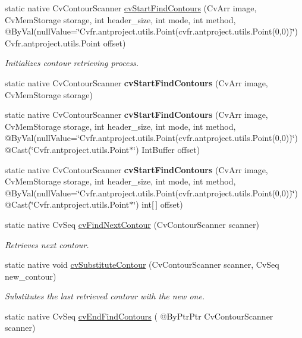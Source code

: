 \begin{DoxyCompactItemize}
\item 
static native Cv\+Contour\+Scanner \hyperlink{group__imgproc__c_ga17ceae2468b1b23ece917fb982a377ff}{cv\+Start\+Find\+Contours} (Cv\+Arr image, Cv\+Mem\+Storage storage, int header\+\_\+size, int mode, int method, @By\+Val(null\+Value=\char`\"{}Cv\+fr.antproject.utils.Point(cv\+fr.antproject.utils.Point(0,0))\char`\"{}) Cv\+fr.antproject.utils.Point offset)
\begin{DoxyCompactList}\small\item\em Initializes contour retrieving process. \end{DoxyCompactList}\item 
static native Cv\+Contour\+Scanner {\bfseries cv\+Start\+Find\+Contours} (Cv\+Arr image, Cv\+Mem\+Storage storage)
\item 
static native Cv\+Contour\+Scanner {\bfseries cv\+Start\+Find\+Contours} (Cv\+Arr image, Cv\+Mem\+Storage storage, int header\+\_\+size, int mode, int method, @By\+Val(null\+Value=\char`\"{}Cv\+fr.antproject.utils.Point(cv\+fr.antproject.utils.Point(0,0))\char`\"{}) @Cast(\char`\"{}Cv\+fr.antproject.utils.Point$\ast$\char`\"{}) Int\+Buffer offset)
\item 
static native Cv\+Contour\+Scanner {\bfseries cv\+Start\+Find\+Contours} (Cv\+Arr image, Cv\+Mem\+Storage storage, int header\+\_\+size, int mode, int method, @By\+Val(null\+Value=\char`\"{}Cv\+fr.antproject.utils.Point(cv\+fr.antproject.utils.Point(0,0))\char`\"{}) @Cast(\char`\"{}Cv\+fr.antproject.utils.Point$\ast$\char`\"{}) int\mbox{[}$\,$\mbox{]} offset)
\item 
static native Cv\+Seq \hyperlink{group__imgproc__c_gab3ea632f49f741ef73888cd1ab8f9556}{cv\+Find\+Next\+Contour} (Cv\+Contour\+Scanner scanner)
\begin{DoxyCompactList}\small\item\em Retrieves next contour. \end{DoxyCompactList}\item 
static native void \hyperlink{group__imgproc__c_ga9d72a578b9f29589e8b85b100cd25e01}{cv\+Substitute\+Contour} (Cv\+Contour\+Scanner scanner, Cv\+Seq new\+\_\+contour)
\begin{DoxyCompactList}\small\item\em Substitutes the last retrieved contour with the new one. \end{DoxyCompactList}\item 
static native Cv\+Seq \hyperlink{group__imgproc__c_ga79913a8abbec2491176f92da28a62346}{cv\+End\+Find\+Contours} ( @By\+Ptr\+Ptr Cv\+Contour\+Scanner scanner)

\end{DoxyCompactItemize}
